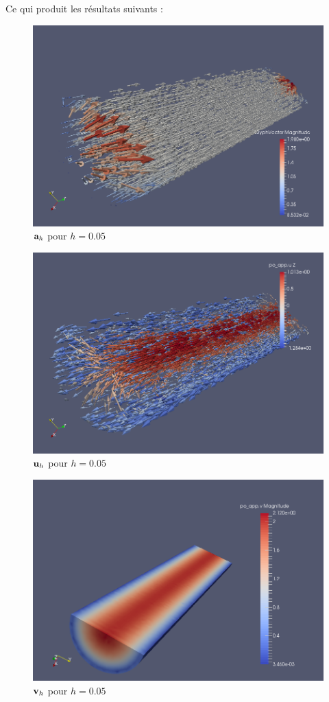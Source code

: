 \documentclass[a4paper,11pt]{article}
\begin{document}
Ce qui produit les résultats suivants :
\begin{figure}[H]
  \centering
  \includegraphics[scale=0.4]{aarrow}
  \caption{${\mathbf{a}}_h$ pour $h=0.05$}
\end{figure}
\begin{figure}[H]
  \centering
  \includegraphics[scale=0.4]{uarrow}
  \caption{${\mathbf{u}}_h$ pour $h=0.05$}
\end{figure}
\begin{figure}[H]
  \centering
  \includegraphics[scale=0.4]{vh}
  \caption{${\mathbf{v}}_h$ pour $h=0.05$}
\end{figure}
\end{document}
